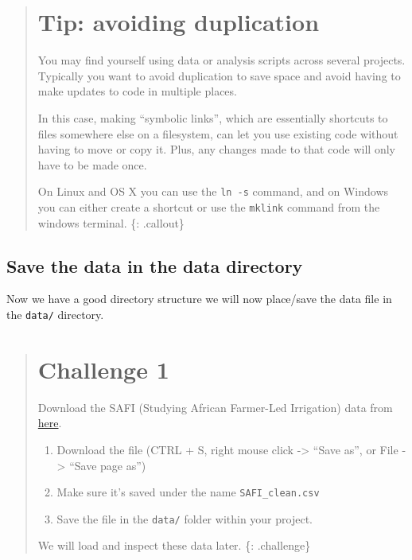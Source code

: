 \documentclass[]{book}
\providecommand{\tightlist}{%
  \setlength{\itemsep}{0pt}\setlength{\parskip}{0pt}}
\begin{document}
\begin{quote}
\section{Tip: avoiding duplication}\label{tip-avoiding-duplication}

You may find yourself using data or analysis scripts across several
projects. Typically you want to avoid duplication to save space and
avoid having to make updates to code in multiple places.

In this case, making ``symbolic links'', which are essentially shortcuts
to files somewhere else on a filesystem, can let you use existing code
without having to move or copy it. Plus, any changes made to that code
will only have to be made once.

On Linux and OS X you can use the \texttt{ln\ -s} command, and on
Windows you can either create a shortcut or use the \texttt{mklink}
command from the windows terminal. \{: .callout\}
\end{quote}

\subsection{Save the data in the data
directory}\label{save-the-data-in-the-data-directory}

Now we have a good directory structure we will now place/save the data
file in the \texttt{data/} directory.

\begin{quote}
\section{Challenge 1}\label{challenge-1}

Download the SAFI (Studying African Farmer-Led Irrigation) data from
\href{https://figshare.com/articles/SAFI_Survey_Results/6262019}{here}.

\begin{enumerate}
\def\labelenumi{\arabic{enumi}.}
\tightlist
\item
  Download the file (CTRL + S, right mouse click -\textgreater{} ``Save
  as'', or File -\textgreater{} ``Save page as'')
\item
  Make sure it's saved under the name \texttt{SAFI\_clean.csv}
\item
  Save the file in the \texttt{data/} folder within your project.
\end{enumerate}

We will load and inspect these data later. \{: .challenge\}
\end{quote}
\end{document}
